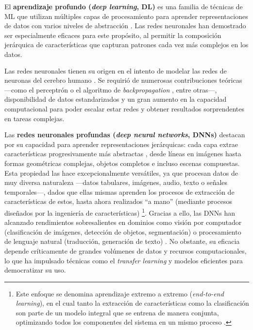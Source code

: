 El \textbf{aprendizaje profundo (\textit{deep learning}, DL)} es una familia de técnicas de ML que utilizan 
múltiples capas de procesamiento para aprender representaciones de datos con varios niveles de abstracción
\cite{lecun2015}. Las redes neuronales han demostrado ser especialmente eficaces para este propósito, al 
permitir la composición jerárquica de características que capturan patrones cada vez más complejos en los 
datos.

Las redes neuronales tienen su origen en el intento de modelar las redes de neuronas del cerebro humano 
\cite{mcculloch1943}. Se requirió de numerosas contribuciones teóricas ---como el perceptrón 
\cite{rosenblatt1958} o el algoritmo de \textit{backpropagation} \cite{rumelhart1986,werbos1994}, entre 
otras---, disponibilidad de datos estandarizados y un gran aumento en la capacidad computacional para poder 
escalar estar redes y obtener resultados 
sorprendentes en tareas complejas.

Las \textbf{redes neuronales profundas (\textit{deep neural networks}, DNNs)} destacan por su capacidad para 
aprender representaciones jerárquicas: cada capa extrae características progresivamente más abstractas 
\cite{lecun2015}, desde líneas en imágenes hasta formas geométricas complejas, objetos completos e incluso 
escenas compuestas.
Esta propiedad las hace excepcionalmente versátiles, ya que procesan datos de muy diversa naturaleza ---datos 
tabulares, imágenes, audio, texto o señales temporales---, dados que ellas mismas aprenden los procesos de 
extracción de características de estos, hasta ahora realizados ``a mano'' (mediante procesos diseñados por la 
ingeniería de características) \cite{rusell2021} 
\footnote{
    Este enfoque se denomina aprendizaje extremo a extremo (\textit{end-to-end learning}), en el cual tanto la 
    extracción de características como la clasificación son parte de un modelo integral que se entrena de 
    manera conjunta, optimizando todos los componentes del sistema en un mismo proceso \cite{rusell2021}.
}. 
Gracias a ello, las DNNs han alcanzado rendimientos sobresalientes en dominios como visión por computador 
(clasificación de imágenes, detección de objetos, segmentación) o procesamiento de lenguaje natural 
(traducción, generación de texto) \cite{redhat2024DeepLearningDefinition}.
No obstante, su eficacia depende críticamente de grandes volúmenes de datos y recursos computacionales, lo que 
ha impulsado técnicas como el \textit{transfer learning} y modelos eficientes para democratizar su uso.


